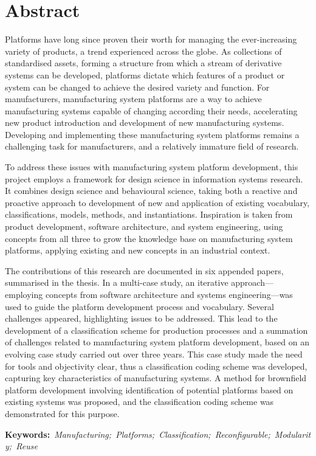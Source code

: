 \chapter*{Abstract}\label{Abstract}
Platforms have long since proven their worth for managing the ever-increasing variety of products, a trend experienced across the globe.
As collections of standardised assets, forming a structure from which a stream of derivative systems can be developed, platforms dictate which features of a product or system can be changed to achieve the desired variety and function.
For manufacturers, manufacturing system platforms are a way to achieve manufacturing systems capable of changing according their needs, accelerating new product introduction and development of new manufacturing systems.
Developing and implementing these manufacturing system platforms remains a challenging task for manufacturers, and a relatively immature field of research.

To address these issues with manufacturing system platform development, this \PhD{} project employs a framework for design science in information systems research.
It combines design science and behavioural science, taking both a reactive and proactive approach to development of new and application of existing vocabulary, classifications, models, methods, and instantiations.
Inspiration is taken from product development, software architecture, and system engineering, using concepts from all three to grow the knowledge base on manufacturing system platforms, applying existing and new concepts in an industrial context.

The contributions of this research are documented in six appended papers, summarised in the thesis.
In a multi-case study, an iterative approach---employing concepts from software architecture and systems engineering---was used to guide the platform development process and vocabulary.
Several challenges appeared, highlighting issues to be addressed.
This lead to the development of a classification scheme for production processes and a summation of challenges related to manufacturing system platform development, based on an evolving case study carried out over three years.
This case study made the need for tools and objectivity clear, thus a classification coding scheme was developed, capturing key characteristics of manufacturing systems.
A method for brownfield platform development involving identification of potential platforms based on existing systems was proposed, and the classification coding scheme was demonstrated for this purpose.


\vfill\noindent\textbf{Keywords:}\ \emph{Manufacturing;\ Platforms;\ Classification;\ Reconfigurable;\ Modularity;\ Reuse}